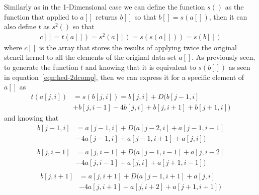 \documentclass{acm_proc_article-sp}
\begin{document}
Similarly as in the 1-Dimensional case we can define the function $s()$ as the function that applied to $a[]$ returns $b[]$ so that $b[]=s(a[])$, then it can also define $t$ as $s^2()$ so that
\begin{equation}
  \begin{split}
    c[] = t(a[]) = s^2(a[]) = s(s(a[])) = s(b[])
  \end{split}
  \label{eqn:hed-2dcomp}
\end{equation}
where $c[]$ is the array that stores the results of applying twice the original stencil kernel to all the elements of the original data-set $a[]$. As previously seen, to generate the function $t$ and knowing that it is equivalent to $s(b[])$ as seen in equation~\eqref{eqn:hed-2dcomp}, then we can express it for a specific element of $a[]$ as
\begin{equation}
  \begin{split}
    t(a[j,i]) &= s(b[j,i]) = b[j,i] + D(b[j-1,i]\\
    &+ b[j,i-1] - 4b[j,i] + b[j,i+1] + b[j+1,i])
  \end{split}
  \label{eqn:hed-2dcomp2}
\end{equation}
and knowing that 
\begin{equation}
  \begin{split}
    b[j-1,i] &= a[j-1,i] + D(a[j-2,i] + a[j-1,i-1]\\
    &- 4a[j-1,i] + a[j-1,i+1] + a[j,i])\\
  \end{split}
  \label{eqn:hed-2alla}
\end{equation}
\begin{equation}
  \begin{split}
    b[j,i-1] &= a[j,i-1] + D(a[j-1,i-1] + a[j,i-2]\\
    &- 4a[j,i-1] + a[j,i] + a[j+1,i-1])\\
  \end{split}
  \label{eqn:hed-2allb}
\end{equation}
\begin{equation}
  \begin{split}
    b[j,i+1] &= a[j,i+1] + D(a[j-1,i+1] + a[j,i]\\
    &- 4a[j,i+1] + a[j,i+2] + a[j+1,i+1])\\
  \end{split}
  \label{eqn:hed-2alld}
\end{equation}
\end{document}
